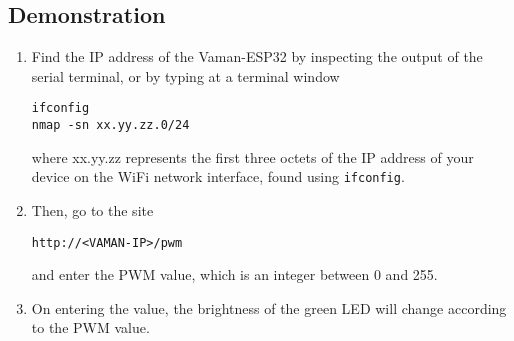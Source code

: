 \subsection{Demonstration}
\begin{enumerate}[resume]
    \item Find the IP address of the Vaman-ESP32 by inspecting the output of the
    serial terminal, or by typing at a terminal window
    \begin{lstlisting}
ifconfig
nmap -sn xx.yy.zz.0/24
    \end{lstlisting}
    where xx.yy.zz represents the first three octets of the IP address of your
    device on the WiFi network interface, found using \texttt{ifconfig}.
    \item Then, go to the site 
    \begin{lstlisting}
http://<VAMAN-IP>/pwm 
    \end{lstlisting}
    and enter the PWM value, which is an integer between 0 and 255.
    \item On entering the value, the brightness of the green LED will change 
    according to the PWM value.
\end{enumerate}